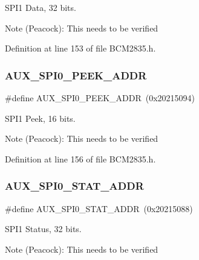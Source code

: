 S\+P\+I1 Data, 32 bits. 

\begin{DoxyNote}{Note}
(Peacock)\+: This needs to be verified 
\end{DoxyNote}


Definition at line 153 of file B\+C\+M2835.\+h.

\mbox{\label{group__SPI_gaaee919a849467dd94432c2852c391374}} 
\subsubsection{\texorpdfstring{A\+U\+X\+\_\+\+S\+P\+I0\+\_\+\+P\+E\+E\+K\+\_\+\+A\+D\+DR}{AUX\_SPI0\_PEEK\_ADDR}}
{\footnotesize\ttfamily \#define A\+U\+X\+\_\+\+S\+P\+I0\+\_\+\+P\+E\+E\+K\+\_\+\+A\+D\+DR~(0x20215094)}



S\+P\+I1 Peek, 16 bits. 

\begin{DoxyNote}{Note}
(Peacock)\+: This needs to be verified 
\end{DoxyNote}


Definition at line 156 of file B\+C\+M2835.\+h.

\mbox{\label{group__SPI_ga7630890159506d96bfeb196837c2efba}} 
\subsubsection{\texorpdfstring{A\+U\+X\+\_\+\+S\+P\+I0\+\_\+\+S\+T\+A\+T\+\_\+\+A\+D\+DR}{AUX\_SPI0\_STAT\_ADDR}}
{\footnotesize\ttfamily \#define A\+U\+X\+\_\+\+S\+P\+I0\+\_\+\+S\+T\+A\+T\+\_\+\+A\+D\+DR~(0x20215088)}



S\+P\+I1 Status, 32 bits. 

\begin{DoxyNote}{Note}
(Peacock)\+: This needs to be verified 
\end{DoxyNote}


